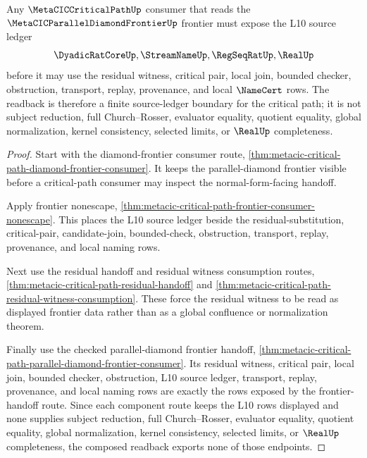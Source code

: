 \begin{theorem}
\label{thm:metacic-critical-path-l10-source-ledger-readback}
Any $\MetaCICCriticalPathUp$ consumer that reads the
$\MetaCICParallelDiamondFrontierUp$ frontier must expose the L10 source ledger
$$
\DyadicRatCoreUp,\StreamNameUp,\RegSeqRatUp,\RealUp
$$
before it may use the residual witness, critical pair, local join, bounded
checker, obstruction, transport, replay, provenance, and local
$\NameCert$ rows. The readback is therefore a finite source-ledger boundary
for the critical path; it is not subject reduction, full Church--Rosser,
evaluator equality, quotient equality, global normalization, kernel
consistency, selected limits, or $\RealUp$ completeness.
\end{theorem}
\begin{proof}
Start with the diamond-frontier consumer route,
\autoref{thm:metacic-critical-path-diamond-frontier-consumer}. It keeps the
parallel-diamond frontier visible before a critical-path consumer may inspect
the normal-form-facing handoff.

Apply frontier nonescape,
\autoref{thm:metacic-critical-path-frontier-consumer-nonescape}. This places
the L10 source ledger beside the residual-substitution, critical-pair,
candidate-join, bounded-check, obstruction, transport, replay, provenance,
and local naming rows.

Next use the residual handoff and residual witness consumption routes,
\autoref{thm:metacic-critical-path-residual-handoff} and
\autoref{thm:metacic-critical-path-residual-witness-consumption}. These force
the residual witness to be read as displayed frontier data rather than as a
global confluence or normalization theorem.

Finally use the checked parallel-diamond frontier handoff,
\autoref{thm:metacic-critical-path-parallel-diamond-frontier-consumer}. Its
residual witness, critical pair, local join, bounded checker, obstruction, L10
source ledger, transport, replay, provenance, and local naming rows are exactly
the rows exposed by the frontier-handoff route. Since each component route keeps
the L10 rows displayed and none supplies subject reduction, full Church--Rosser,
evaluator equality, quotient equality, global normalization, kernel
consistency, selected limits, or $\RealUp$ completeness, the composed readback
exports none of those endpoints.
\end{proof}

